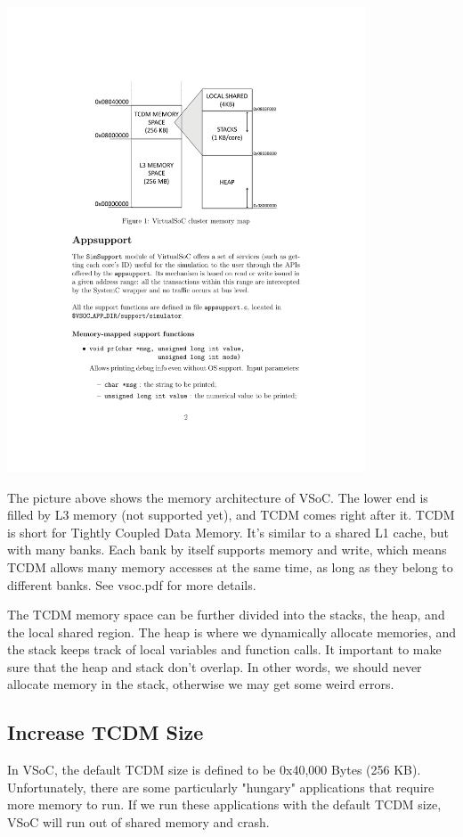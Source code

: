 \documentclass{article}
\begin{document}
\begin{center}
\includegraphics[trim = 50mm 155mm 50mm 40mm, clip, width=0.8\textwidth]{pictures/Memory_Architecture.pdf}
\end{center}

The picture above shows the memory architecture of VSoC. The lower end is filled by L3 memory (not supported yet), and TCDM comes right after it. TCDM is short for Tightly Coupled Data Memory. It's similar to a shared L1 cache, but with many banks. Each bank by itself supports memory and write, which means TCDM allows many memory accesses at the same time, as long as they belong to different banks. See  vsoc.pdf \cite{vsoc} for more details.

The TCDM memory space can be further divided into the stacks, the heap, and the local shared region. The heap is where we dynamically allocate memories, and the stack keeps track of local variables and function calls. It important to make sure that the heap and stack don't overlap. In other words, we should never allocate memory in the stack, otherwise we may get some weird errors. 

\subsection{Increase TCDM Size}
In VSoC, the default TCDM size is defined to be 0x40,000 Bytes (256 KB).  Unfortunately,  there are some particularly "hungary" applications that require more memory to run.  If we run these applications with the default TCDM size, VSoC will run out of shared memory and crash.
\end{document}

